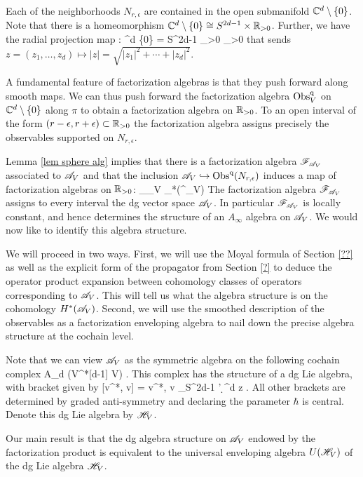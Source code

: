 \documentclass[10pt]{amsart}
\begin{document}
Each of the neighborhoods $N_{r,\epsilon}$ are contained in the open submanifold $\mathbb C^{d} \setminus \{0\}$.
Note that there is a homeomorphism $\mathbb C^{d} \setminus \{0\} \cong S^{2d-1} \times \mathbb R_{>0}$.
Further, we have the radial projection map
\ben
\pi : \CC^{d} \setminus \{0\} = S^{2d-1} \times \RR_{>0} \to \RR_{>0} 
\een
that sends $z = (z_1,\ldots,z_d) \mapsto |z| = \sqrt{|z_1|^2+\cdots+|z_d|^2}$. 

A fundamental feature of factorization algebras is that they push forward along smooth maps. 
We can thus push forward the factorization algebra ${\rm Obs}^{\rm q}_V$ on $\mathbb C^{d}\setminus \{0\}$ along $\pi$ to obtain a factorization algebra on $\mathbb R_{>0}$. 
To an open interval of the form $(r-\epsilon, r+\epsilon)\subset \mathbb R_{>0}$ the factorization algebra assigns precisely the observables supported on $N_{r,\epsilon}$. 

Lemma \ref{lem sphere alg} implies that there is a factorization algebra $\mathscr F_{\mathscr A_V}$ associated to $\mathscr A_V$ and that the inclusion $\mathscr A_V \hookrightarrow {\rm Obs}^{\rm q}(N_{r,\epsilon})$ induces a map of factorization algebras on $\mathbb R_{>0}$:
\ben
\sF_{\sA_V} \to \pi_*(\Obs^\q_V) 
\een
The factorization algebra $\mathscr F_{\mathscr A_V}$ assigns to every interval the dg vector space $\mathscr A_V$. 
In particular $\mathscr F_{\mathscr A_V}$ is locally constant, and hence determines the structure of an $A_\infty$ algebra on $\mathscr A_V$. 
We would now like to identify this algebra structure. 

We will proceed in two ways. 
First, we will use the Moyal formula of Section \ref{??} as well as the explicit form of the propagator from Section \ref{?} to deduce the operator product expansion between cohomology classes of operators corresponding to $\mathscr A_V$. 
This will tell us what the algebra structure is on the cohomology $H^*(\mathscr A_V)$. 
Second, we will use the smoothed description of the observables as a factorization enveloping algebra to nail down the precise algebra structure at the cochain level. 

Note that we can view $\mathscr A_V$ as the symmetric algebra on the following cochain complex
\ben
A_d \tensor (V^*[d-1] \tensor V) \oplus \CC \cdot \hbar .
\een
This complex has the structure of a dg Lie algebra, with bracket given by
\be\label{HV bracket}
[\alpha \tensor v^*, \alpha \tensor v] = \hbar \<v^*, v\> \oint_{S^{2d-1}} \alpha \wedge \alpha'  \d^d z .
\ee
All other brackets are determined by graded anti-symmetry and declaring the parameter $\hbar$ is central.
Denote this dg Lie algebra by $\mathscr H_V$. 

Our main result is that the dg algebra structure on $\mathscr A_V$ endowed by the factorization product is equivalent to the universal enveloping algebra $U(\mathscr H_V)$ of the dg Lie algebra $\mathscr H_V$.
\end{document}
